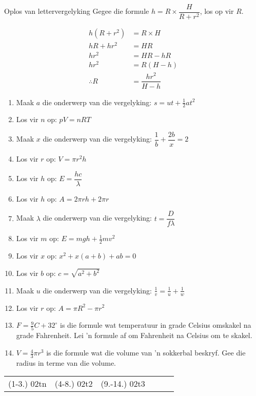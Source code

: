 \begin{wex}
{Oplos van lettervergelyking}
{
Gegee die formule $h=  R\times \dfrac{H}{R+r^2}$, los op vir $R$.
}
{
\begin{align*}
  h(R+r^2) &= R \times H \\
  hR + hr^2 &= HR \\
  hr^2 &= HR - hR \\
  hr^2 &= R(H - h) \\
  \therefore R &= \dfrac{hr^2}{H-h}
\end{align*}

} 
\end{wex}
\begin{exercises}{}
{
\begin{enumerate}[itemsep=5pt, label=\textbf{\arabic*}. ] 
\item Maak $a$ die onderwerp van die vergelyking: $s=ut+\frac{1}{2}at^{2}$
\item Los vir $n$ op: $pV=nRT$  
\item Maak $x$ die onderwerp van die vergelyking: $\dfrac{1}{b}+\dfrac{2b}{x}=2$
\item Los vir $r$ op: $V = \pi r^{2} h$ 
\item Los vir $h$ op: $E=\dfrac{hc}{\lambda}$ 
\item Los vir $h$ op: $A=2\pi rh + 2 \pi r$ 
\item Maak $\lambda$ die onderwerp van die vergelyking: $t=\dfrac{D}{f \lambda}$
\item Los vir $m$ op: $E=mgh + \frac{1}{2}mv^{2}$ 
\item Los vir $x$ op: $x^2+x(a+b)+ab=0$ 
\item Los vir $b$ op: $c=\sqrt{a^2+b^2}$ 
\item Maak $u$ die onderwerp van die vergelyking: $\frac{1}{v}=\frac{1}{u}+\frac{1}{w}$
\item Los vir $r$ op: $A=\pi R^2 -\pi r^2$  
\item $F=\frac{9}{5}C + 32^\circ$ is die formule wat temperatuur in grade Celsius omskakel na grade Fahrenheit. Lei 'n formule af om Fahrenheit na Celsius om te skakel.

\item $V=\frac{4}{3}\pi r^3$  is die formule wat die volume van 'n sokkerbal beskryf. Gee die radius in terme van die volume.
\end{enumerate}
\practiceinfo
\par 
\par \begin{tabular}[h]{cccccc}
(1-3.) 02tn &   (4-8.) 02t2 & (9.-14.) 02t3 \end{tabular}
}
\end{exercises}



